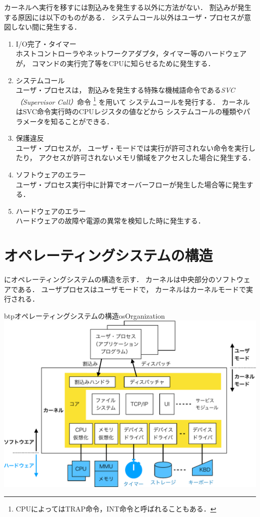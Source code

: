 カーネルへ実行を移すには割込みを発生する以外に方法がない．
割込みが発生する原因には以下のものがある．
システムコール以外はユーザ・プロセスが意図しない間に発生する．

\begin{enumerate}
\item I/O完了・タイマー \\
  ホストコントローラやネットワークアダプタ，タイマー等のハードウェアが，
  コマンドの実行完了等をCPUに知らせるために発生する．
\item システムコール \\
  ユーザ・プロセスは，
  割込みを発生する特殊な機械語命令である\emph{SVC（Supervisor Call）}命令
  \footnote{
    CPUによってはTRAP命令，INT命令と呼ばれることもある．
  }
  を用いて
  システムコールを発行する．
  カーネルはSVC命令実行時のCPUレジスタの値などから
  システムコールの種類やパラメータを知ることができる．
\item 保護違反 \\
  ユーザ・プロセスが，
  ユーザ・モードでは実行が許可されない命令を実行したり，
  アクセスが許可されないメモリ領域をアクセスした場合に発生する．
\item ソフトウェアのエラー \\
  ユーザ・プロセス実行中に計算でオーバーフローが発生した場合等に発生する．
\item ハードウェアのエラー \\
  ハードウェアの故障や電源の異常を検知した時に発生する．
\end{enumerate}

\section{オペレーティングシステムの構造}
にオペレーティングシステムの構造を示す．
カーネルは中央部分のソフトウェアである．
ユーザプロセスはユーザモードで，
カーネルはカーネルモードで実行される．

\begin{myfig}{btp}{オペレーティングシステムの構造}{osOrganization}
  \includegraphics[scale=0.66]{Fig/osOrganization-crop.pdf}
\end{myfig}


